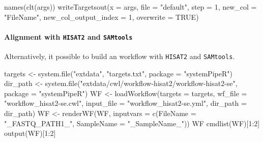 \documentclass[14pt,]{article}
\newcommand{\hlnum}[1]{\textcolor[rgb]{0.816,0.125,0.439}{#1}}%
\newcommand{\hlstr}[1]{\textcolor[rgb]{0.251,0.627,0.251}{#1}}%
\newcommand{\hlstd}[1]{\textcolor[rgb]{0.251,0.251,0.251}{#1}}%
\newenvironment{Shaded}{\begin{myshaded}}{\end{myshaded}}
\newcommand{\DecValTok}[1]{\hlnum{#1}}
\newcommand{\ConstantTok}[1]{\hlnum{#1}}
\newcommand{\SpecialCharTok}[1]{\hlstr{#1}}
\newcommand{\StringTok}[1]{\hlstr{#1}}
\newcommand{\OtherTok}[1]{{#1}}
\newcommand{\FunctionTok}[1]{\hlstd{#1}}
\newcommand{\AttributeTok}[1]{{#1}}
\newcommand{\NormalTok}[1]{\hlstd{#1}}
\begin{document}
\begin{Shaded}
\begin{Highlighting}[]
\FunctionTok{names}\NormalTok{(}\FunctionTok{clt}\NormalTok{(args))}
\FunctionTok{writeTargetsout}\NormalTok{(}\AttributeTok{x =}\NormalTok{ args, }\AttributeTok{file =} \StringTok{"default"}\NormalTok{, }\AttributeTok{step =} \DecValTok{1}\NormalTok{, }\AttributeTok{new\_col =} \StringTok{"FileName"}\NormalTok{, }\AttributeTok{new\_col\_output\_index =} \DecValTok{1}\NormalTok{, }
    \AttributeTok{overwrite =} \ConstantTok{TRUE}\NormalTok{)}
\end{Highlighting}
\end{Shaded}

\hypertarget{alignment-with-hisat2-and-samtools}{%
\paragraph{\texorpdfstring{Alignment with \texttt{HISAT2} and \texttt{SAMtools}}{Alignment with HISAT2 and SAMtools}}\label{alignment-with-hisat2-and-samtools}}

Alternatively, it possible to build an workflow with \texttt{HISAT2} and \texttt{SAMtools}.

\begin{Shaded}
\begin{Highlighting}[]
\NormalTok{targets }\OtherTok{\textless{}{-}} \FunctionTok{system.file}\NormalTok{(}\StringTok{"extdata"}\NormalTok{, }\StringTok{"targets.txt"}\NormalTok{, }\AttributeTok{package =} \StringTok{"systemPipeR"}\NormalTok{)}
\NormalTok{dir\_path }\OtherTok{\textless{}{-}} \FunctionTok{system.file}\NormalTok{(}\StringTok{"extdata/cwl/workflow{-}hisat2/workflow{-}hisat2{-}se"}\NormalTok{, }\AttributeTok{package =} \StringTok{"systemPipeR"}\NormalTok{)}
\NormalTok{WF }\OtherTok{\textless{}{-}} \FunctionTok{loadWorkflow}\NormalTok{(}\AttributeTok{targets =}\NormalTok{ targets, }\AttributeTok{wf\_file =} \StringTok{"workflow\_hisat2{-}se.cwl"}\NormalTok{, }\AttributeTok{input\_file =} \StringTok{"workflow\_hisat2{-}se.yml"}\NormalTok{, }
    \AttributeTok{dir\_path =}\NormalTok{ dir\_path)}
\NormalTok{WF }\OtherTok{\textless{}{-}} \FunctionTok{renderWF}\NormalTok{(WF, }\AttributeTok{inputvars =} \FunctionTok{c}\NormalTok{(}\AttributeTok{FileName =} \StringTok{"\_FASTQ\_PATH1\_"}\NormalTok{, }\AttributeTok{SampleName =} \StringTok{"\_SampleName\_"}\NormalTok{))}
\NormalTok{WF}
\FunctionTok{cmdlist}\NormalTok{(WF)[}\DecValTok{1}\SpecialCharTok{:}\DecValTok{2}\NormalTok{]}
\FunctionTok{output}\NormalTok{(WF)[}\DecValTok{1}\SpecialCharTok{:}\DecValTok{2}\NormalTok{]}
\end{Highlighting}
\end{Shaded}
\end{document}
